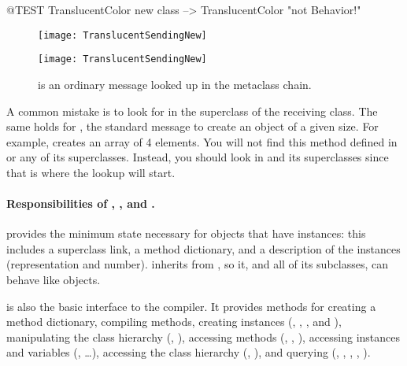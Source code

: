 \documentclass[a4paper,10pt,twoside]{book}
\begin{document}
\begin{code}{@TEST}
TranslucentColor new class --> TranslucentColor    "not Behavior!"
\end{code}

\begin{center}
\begin{figure}
\ifluluelse
	{\centerline{\texttt{[image: TranslucentSendingNew]}}}
	{\centerline{\texttt{[image: TranslucentSendingNew]}}}
\caption{ is an ordinary message looked up in the metaclass chain.\label{fig:sendingnew}}
\end{figure}
\end{center}

A common mistake is to look for  in the superclass of the receiving class.
The same holds for , the standard message to create an object of a given size.
For example,  creates an array of 4 elements.
You will not find this method defined in  or any of its superclasses.
Instead, you should look in  and its superclasses since that is where the lookup will start.


\paragraph{Responsibilities of , , and .}
 provides the minimum state necessary for objects that have instances: this includes a superclass link, a method dictionary, and a description of the instances (\ie representation and number).
 inherits from , so it, and all of its subclasses, can behave like objects.

 is also the basic interface to the compiler.
It provides methods for creating a method dictionary,
compiling methods,
creating instances (\ie {}, , , and ),
manipulating the class hierarchy (\ie {}, ),
accessing methods (\ie {}, , ),
accessing instances and variables (\ie {}, \ldots),
accessing the class hierarchy (\ie {}, ), and
querying (\ie {}, , , , ).
\end{document}
